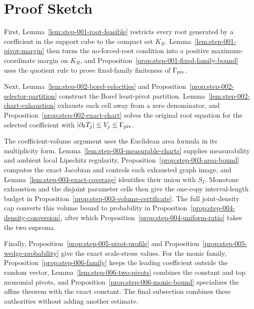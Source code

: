 \section{Proof Sketch}\label{sec:proof-sketch}

First, Lemma~\ref{lem:step-001-root-feasible} restricts every root generated
by a coefficient in the support cube to the compact set $K_R$.
Lemma~\ref{lem:step-001-pivot-margin} then turns the no-forced-root condition
into a positive maximum-coordinate margin on $K_R$, and
Proposition~\ref{prop:step-001-fixed-family-bound} uses the quotient rule to
prove fixed-family finiteness of $\Gamma_{\rm piv}$.

Next, Lemma~\ref{lem:step-002-borel-velocities} and
Proposition~\ref{prop:step-002-selector-partition} construct the Borel
least-pivot partition.  Lemma~\ref{lem:step-002-chart-exhaustion} exhausts
each cell away from a zero denominator, and
Proposition~\ref{prop:step-002-exact-chart} solves the original root equation
for the selected coefficient with
$|\partial_\theta T_j|\leq V_j\leq\Gamma_{\rm piv}$.

The coefficient-volume argument uses the Euclidean area formula in its
multiplicity form.  Lemma~\ref{lem:step-003-measurable-charts} supplies
measurability and ambient local Lipschitz regularity,
Proposition~\ref{prop:step-003-area-bound} computes the exact Jacobian and
controls each exhausted graph image, and
Lemma~\ref{lem:step-003-exact-coverage} identifies their union with $S_I$.
Monotone exhaustion and the disjoint parameter cells then give the
one-copy interval-length budget in
Proposition~\ref{prop:step-003-volume-certificate}.  The full joint-density
cap converts this volume bound to probability in
Proposition~\ref{prop:step-004-density-conversion}, after which
Proposition~\ref{prop:step-004-uniform-ratio} takes the two suprema.

Finally, Proposition~\ref{prop:step-005-pivot-profile} and
Proposition~\ref{prop:step-005-wedge-probability} give the exact scale-stress
values.  For the monic family,
Proposition~\ref{prop:step-006-family} keeps the leading coefficient outside
the random vector, Lemma~\ref{lem:step-006-two-pivots} combines the constant
and top monomial pivots, and
Proposition~\ref{prop:step-006-monic-bound} specializes the affine theorem
with the exact constant.  The final subsection combines these authorities
without adding another estimate.

